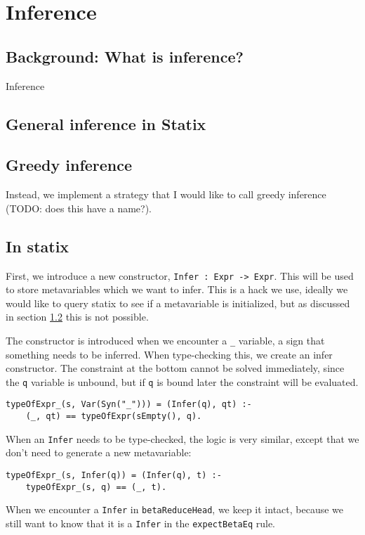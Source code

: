 \chapter{Inference}

\section{Background: What is inference?}

Inference 

\section{General inference in Statix}
\label{general-inference}

\section{Greedy inference}

Instead, we implement a strategy that I would like to call greedy inference (TODO: does this have a name?). 

\section{In statix}

First, we introduce a new constructor, \verb|Infer : Expr -> Expr|. This will be used to store metavariables which we want to infer. This is a hack we use, ideally we would like to query statix to see if a metavariable is initialized, but as discussed in section \ref{general-inference} this is not possible. 

The constructor is introduced when we encounter a \verb|_| variable, a sign that something needs to be inferred. When type-checking this, we create an infer constructor. The constraint at the bottom cannot be solved immediately, since the \verb|q| variable is unbound, but if \verb|q| is bound later the constraint will be evaluated.

\begin{lstlisting}
typeOfExpr_(s, Var(Syn("_"))) = (Infer(q), qt) :-
	(_, qt) == typeOfExpr(sEmpty(), q).
\end{lstlisting}
When an \verb|Infer| needs to be type-checked, the logic is very similar, except that we don't need to generate a new metavariable:

\begin{lstlisting}
typeOfExpr_(s, Infer(q)) = (Infer(q), t) :-
	typeOfExpr_(s, q) == (_, t).
\end{lstlisting}
When we encounter a \verb|Infer| in \verb|betaReduceHead|, we keep it intact, because we still want to know that it is a \verb|Infer| in the \verb|expectBetaEq| rule. 

